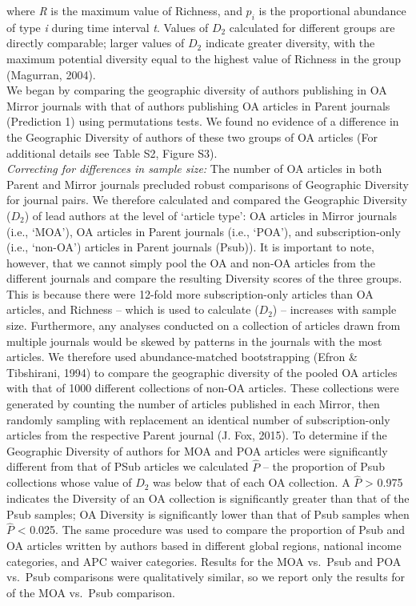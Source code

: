 \documentclass[
  english,
  man]{apa6}
\begin{document}
where \emph{R} is the maximum value of Richness, and \(p_{i}\) is the proportional abundance of type \emph{i} during time interval \emph{t}. Values of \(D_{2}\) calculated for different groups are directly comparable; larger values of \(D_{2}\) indicate greater diversity, with the maximum potential diversity equal to the highest value of Richness in the group (Magurran, 2004).\\
We began by comparing the geographic diversity of authors publishing in OA Mirror journals with that of authors publishing OA articles in Parent journals (Prediction 1) using permutations tests. We found no evidence of a difference in the Geographic Diversity of authors of these two groups of OA articles (For additional details see Table S2, Figure S3).\\
\emph{Correcting for differences in sample size:} The number of OA articles in both Parent and Mirror journals precluded robust comparisons of Geographic Diversity for journal pairs. We therefore calculated and compared the Geographic Diversity (\(D_{2}\)) of lead authors at the level of `article type': OA articles in Mirror journals (i.e., `MOA'), OA articles in Parent journals (i.e., `POA'), and subscription-only (i.e., `non-OA') articles in Parent journals (Psub)). It is important to note, however, that we cannot simply pool the OA and non-OA articles from the different journals and compare the resulting Diversity scores of the three groups. This is because there were 12-fold more subscription-only articles than OA articles, and Richness -- which is used to calculate (\(D_{2}\)) -- increases with sample size. Furthermore, any analyses conducted on a collection of articles drawn from multiple journals would be skewed by patterns in the journals with the most articles. We therefore used abundance-matched bootstrapping (Efron \& Tibshirani, 1994) to compare the geographic diversity of the pooled OA articles with that of 1000 different collections of non-OA articles. These collections were generated by counting the number of articles published in each Mirror, then randomly sampling with replacement an identical number of subscription-only articles from the respective Parent journal (J. Fox, 2015). To determine if the Geographic Diversity of authors for MOA and POA articles were significantly different from that of PSub articles we calculated \(\hat{P}\) -- the proportion of Psub collections whose value of \(D_{2}\) was below that of each OA collection. A \(\hat{P}\) \textgreater{} 0.975 indicates the Diversity of an OA collection is significantly greater than that of the Psub samples; OA Diversity is significantly lower than that of Psub samples when \(\hat{P}\) \textless{} 0.025. The same procedure was used to compare the proportion of Psub and OA articles written by authors based in different global regions, national income categories, and APC waiver categories. Results for the MOA vs.~Psub and POA vs.~Psub comparisons were qualitatively similar, so we report only the results for of the MOA vs.~Psub comparison.\\
\end{document}
